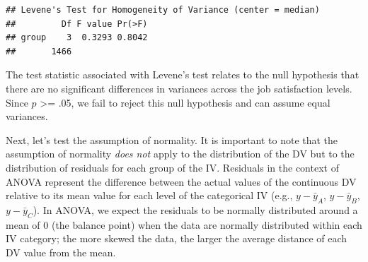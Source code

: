 \documentclass[
]{book}
\begin{document}
\begin{verbatim}
## Levene's Test for Homogeneity of Variance (center = median)
##         Df F value Pr(>F)
## group    3  0.3293 0.8042
##       1466
\end{verbatim}

The test statistic associated with Levene's test relates to the null hypothesis that there are no significant differences in variances across the job satisfaction levels. Since \(p\) \textgreater= .05, we fail to reject this null hypothesis and can assume equal variances.

Next, let's test the assumption of normality. It is important to note that the assumption of normality \emph{does not} apply to the distribution of the DV but to the distribution of residuals for each group of the IV. Residuals in the context of ANOVA represent the difference between the actual values of the continuous DV relative to its mean value for each level of the categorical IV (e.g., \(y - \bar{y}_A\), \(y - \bar{y}_B\), \(y - \bar{y}_C\)). In ANOVA, we expect the residuals to be normally distributed around a mean of 0 (the balance point) when the data are normally distributed within each IV category; the more skewed the data, the larger the average distance of each DV value from the mean.
\end{document}
